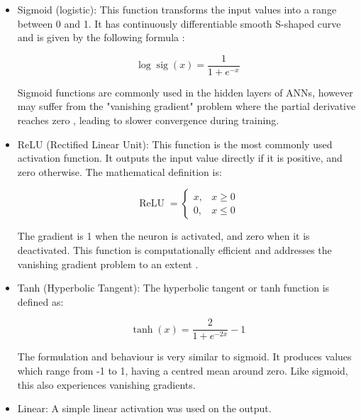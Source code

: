 \begin{itemize}
	\item Sigmoid (logistic): This function transforms the input values into a range between 0 and 1. It has continuously differentiable smooth S-shaped curve and is given by the following formula \cite{Han1995}:
	
	\begin{equation}\label{Logistic sigmoid}
		\log \operatorname{sig}(x)=\frac{1}{1+e^{-x}}
	\end{equation} 
	
	Sigmoid functions are commonly used in the hidden layers of ANNs, however may suffer from the "vanishing gradient" problem where the partial derivative reaches zero \cite{Sharma2020}, leading to slower convergence during training.
	
	\item ReLU (Rectified Linear Unit): This function is the most commonly used activation function. It outputs the input value directly if it is positive, and zero otherwise. The mathematical definition is:
	
	\begin{equation}\label{ReLU}
		\operatorname{ReLU}= \begin{cases}x, & x \geq 0 \\ 0, & x \leq 0\end{cases}
	\end{equation}
	
	The gradient is 1 when the neuron is activated, and zero when it is deactivated. This function is computationally efficient and addresses the vanishing gradient problem to an extent \cite{Sharma2020}.
	
	\item Tanh (Hyperbolic Tangent): The hyperbolic tangent or tanh function is defined as:
	
	\begin{equation}\label{Hyperbolic tangent}
		\tanh (x)=\frac{2}{1+e^{-2 x}}-1
	\end{equation}
	
	The formulation and behaviour is very similar to sigmoid. It produces values which range from -1 to 1, having a centred mean around zero. Like sigmoid, this also experiences vanishing gradients.
	
	\item Linear: A simple linear activation was used on the output.
	
\end{itemize}

